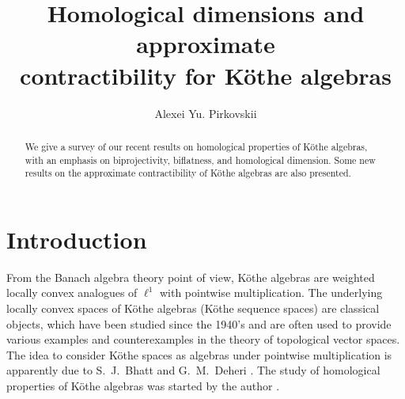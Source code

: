 \documentclass[12pt,reqno]{amsart}
\theoremstyle{definition}
\begin{document}

\title[Homological properties of K\"othe algebras]{Homological dimensions
and approximate\\ contractibility
for K\"othe algebras}

\author{Alexei Yu. Pirkovskii}
\address{Department of Nonlinear Analysis and Optimization,
Faculty of Science\\
Peoples' Friendship University of Russia\\
Mikluho-Maklaya 6, 117198 Moscow, Russia\\
Email: pirkosha@sci.pfu.edu.ru, pirkosha@online.ru}

\maketitle

\begin{abstract}
We give a survey of our recent results on homological properties
of K\"othe algebras, with an emphasis on biprojectivity, biflatness,
and homological dimension. Some new results on the approximate contractibility
of K\"othe algebras are also presented.
\end{abstract}

\section{Introduction}
From the Banach algebra theory point of view, K\"othe algebras are weighted
locally convex analogues of $\ell^1$ with pointwise multiplication.
The underlying locally convex spaces of K\"othe algebras (K\"othe sequence spaces)
are classical objects, which have been studied since the 1940's
\cite{Kothe_stufen} and are often used to provide various examples and
counterexamples in the theory of topological vector spaces.
The idea to consider K\"othe spaces as algebras under pointwise multiplication
is apparently due to S.~J.~Bhatt and G.~M.~Deheri \cite{Bh_Deh}. The study of homological
properties of K\"othe algebras was started by the author \cite{Pir_bipr}.
\end{document}
